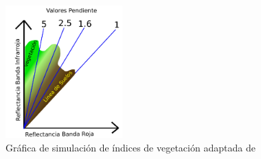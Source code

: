 \begin{figure}[H]
    \centering
    \includegraphics[width=0.4\textwidth]{images/indiceVegetacion.pdf}
    \caption{Gráfica de simulación de índices de vegetación adaptada de~\cite{munoz2017apuntes} }
    \label{fig:indicesBasadosEnLaPendiente}
\end{figure}
